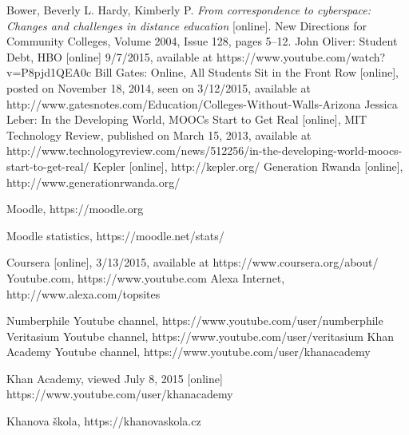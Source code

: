
\def\bibname{Bibliography}
\begin{thebibliography}{99}
\addcontentsline{toc}{chapter}{\bibname}


{\sc Bower,} Beverly L. {\sc Hardy,} Kimberly P.
\emph{From correspondence to cyberspace: Changes and challenges in distance education} [online].
New Directions for Community Colleges, Volume 2004, Issue 128, pages 5–12.
John Oliver: Student Debt, HBO [online] 9/7/2015, available at https://www.youtube.com/watch?v=P8pjd1QEA0c
Bill Gates: Online, All Students Sit in the Front Row [online], posted on November 18, 2014, seen on 3/12/2015, available at http://www.gatesnotes.com/Education/Colleges-Without-Walls-Arizona
Jessica Leber: In the Developing World, MOOCs Start to Get Real [online], MIT Technology Review, published on March 15, 2013, available at http://www.technologyreview.com/news/512256/in-the-developing-world-moocs-start-to-get-real/
Kepler [online], http://kepler.org/
Generation Rwanda [online], http://www.generationrwanda.org/

Moodle, https://moodle.org

Moodle statistics, https://moodle.net/stats/

Coursera [online], 3/13/2015, available at https://www.coursera.org/about/
Youtube.com, https://www.youtube.com
Alexa Internet, http://www.alexa.com/topsites

Numberphile Youtube channel, https://www.youtube.com/user/numberphile
Veritasium Youtube channel, https://www.youtube.com/user/veritasium
Khan Academy Youtube channel, https://www.youtube.com/user/khanacademy

Khan Academy, viewed July 8, 2015 [online]
https://www.youtube.com/user/khanacademy

Khanova škola, https://khanovaskola.cz




\end{thebibliography}
